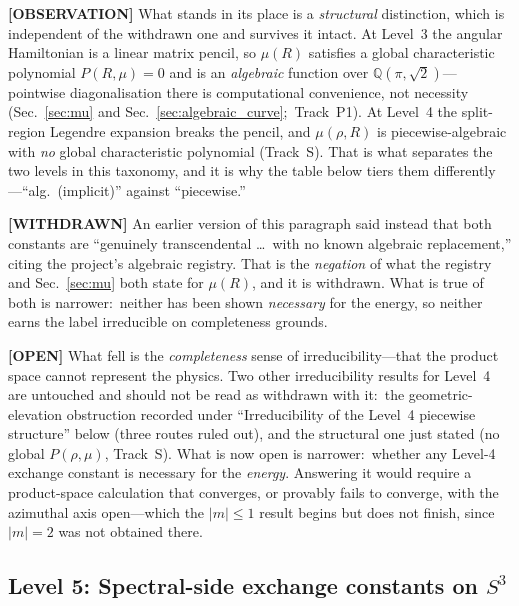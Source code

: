 \documentclass[aps,pra,twocolumn,superscriptaddress,longbibliography]{revtex4-2}
\begin{document}
\textbf{[OBSERVATION]} What stands in its place is a \emph{structural}
distinction, which is independent of the withdrawn one and survives it
intact.  At Level~3 the angular Hamiltonian is a linear matrix pencil, so
$\mu(R)$ satisfies a global characteristic polynomial $P(R,\mu) = 0$ and
is an \emph{algebraic} function over $\mathbb{Q}(\pi,\sqrt2)$---pointwise
diagonalisation there is computational convenience, not necessity
(Sec.~\ref{sec:mu} and Sec.~\ref{sec:algebraic_curve};\ Track~P1).  At Level~4 the split-region
Legendre expansion breaks the pencil, and $\mu(\rho,R)$ is
piecewise-algebraic with \emph{no} global characteristic polynomial
(Track~S).  That is what separates the two levels in this taxonomy, and it
is why the table below tiers them differently---``alg.\ (implicit)''
against ``piecewise.''

\textbf{[WITHDRAWN]} An earlier version of this paragraph said instead that
both constants are ``genuinely transcendental \ldots\ with no known
algebraic replacement,'' citing the project's algebraic registry.  That is
the \emph{negation} of what the registry and Sec.~\ref{sec:mu} both
state for $\mu(R)$, and it is withdrawn.  What is true of both is narrower:\
neither has been shown \emph{necessary} for the energy, so neither earns
the label irreducible on completeness grounds.

\textbf{[OPEN]} What fell is the \emph{completeness} sense of
irreducibility---that the product space cannot represent the physics.  Two
other irreducibility results for Level~4 are untouched and should not be
read as withdrawn with it:\ the geometric-elevation obstruction recorded
under ``Irreducibility of the Level~4 piecewise structure'' below (three
routes ruled out), and the structural one just stated (no global
$P(\rho,\mu)$, Track~S).  What is now open is
narrower:\ whether any Level-4 exchange constant is necessary for the
\emph{energy}.  Answering it would require a product-space calculation
that converges, or provably fails to converge, with the azimuthal axis
open---which the $|m| \le 1$ result begins but does not finish, since
$|m| = 2$ was not obtained there.



\subsection{Level 5: Spectral-side exchange constants on $S^3$}
\label{sec:level5_rh_sprint}
\end{document}
